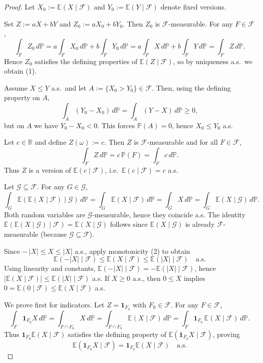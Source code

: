 \begin{proof}
Let $X_0:=\mathbb E(X\mid\mathcal F)$ and $Y_0:=\mathbb E(Y\mid\mathcal F)$ denote fixed versions.

Set $Z:=aX+bY$ and $Z_0:=aX_0+bY_0$. Then $Z_0$ is $\mathcal F$-measurable.
For any $F\in\mathcal F$,
\[
\int_F Z_0\,d\mathbb P
=a\int_F X_0\,d\mathbb P+b\int_F Y_0\,d\mathbb P
=a\int_F X\,d\mathbb P+b\int_F Y\,d\mathbb P
=\int_F Z\,d\mathbb P.
\]
Hence $Z_0$ satisfies the defining properties of $\mathbb E(Z\mid\mathcal F)$, so by uniqueness a.s.\ we obtain (1).

Assume $X\le Y$ a.s.\ and let $A:=\{X_0>Y_0\}\in\mathcal F$.
Then, using the defining property on $A$,
\[
\int_A (Y_0-X_0)\,d\mathbb P=\int_A (Y-X)\,d\mathbb P\ge 0,
\]
but on $A$ we have $Y_0-X_0<0$. This forces $\mathbb P(A)=0$, hence $X_0\le Y_0$ a.s.

Let $c\in\mathbb R$ and define $Z(\omega):=c$. Then $Z$ is $\mathcal F$-measurable and for all $F\in\mathcal F$,
\[
\int_F Z\,d\mathbb P=c\,\mathbb P(F)=\int_F c\,d\mathbb P.
\]
Thus $Z$ is a version of $\mathbb E(c\mid\mathcal F)$, i.e.\ $\mathbb E(c\mid\mathcal F)=c$ a.s.

Let $\mathcal G\subseteq\mathcal F$. For any $G\in\mathcal G$,
\[
\int_G \mathbb E(\mathbb E(X\mid\mathcal F)\mid\mathcal G)\,d\mathbb P
=\int_G \mathbb E(X\mid\mathcal F)\,d\mathbb P
=\int_G X\,d\mathbb P
=\int_G \mathbb E(X\mid\mathcal G)\,d\mathbb P.
\]
Both random variables are $\mathcal G$-measurable, hence they coincide a.s.
The identity $\mathbb E(\mathbb E(X\mid\mathcal G)\mid\mathcal F)=\mathbb E(X\mid\mathcal G)$ follows since
$\mathbb E(X\mid\mathcal G)$ is already $\mathcal F$-measurable (because $\mathcal G\subseteq\mathcal F$).

Since $-\,|X|\le X\le |X|$ a.s., apply monotonicity (2) to obtain
\[
\mathbb E(-|X|\mid\mathcal F)\le \mathbb E(X\mid\mathcal F)\le \mathbb E(|X|\mid\mathcal F)\quad\text{a.s.}
\]
Using linearity and constants, $\mathbb E(-|X|\mid\mathcal F)=-\mathbb E(|X|\mid\mathcal F)$, hence
$|\mathbb E(X\mid\mathcal F)|\le \mathbb E(|X|\mid\mathcal F)$ a.s.
If $X\ge 0$ a.s., then $0\le X$ implies $0=\mathbb E(0\mid\mathcal F)\le \mathbb E(X\mid\mathcal F)$ a.s.

We prove first for indicators. Let $Z=\mathbf 1_{F_0}$ with $F_0\in\mathcal F$.
For any $F\in\mathcal F$,
\[
\int_F \mathbf 1_{F_0}X\,d\mathbb P=\int_{F\cap F_0} X\,d\mathbb P
=\int_{F\cap F_0} \mathbb E(X\mid\mathcal F)\,d\mathbb P
=\int_F \mathbf 1_{F_0}\,\mathbb E(X\mid\mathcal F)\,d\mathbb P.
\]
Thus $\mathbf 1_{F_0}\mathbb E(X\mid\mathcal F)$ satisfies the defining property of
$\mathbb E(\mathbf 1_{F_0}X\mid\mathcal F)$, proving
\[
\mathbb E(\mathbf 1_{F_0}X\mid\mathcal F)=\mathbf 1_{F_0}\mathbb E(X\mid\mathcal F)\quad\text{a.s.}
\]


\end{proof}
